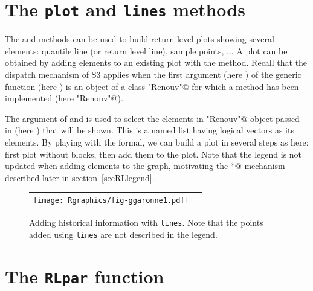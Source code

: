 \documentclass[a4paper]{report}
\begin{document}
\section{The \texttt{plot} and \texttt{lines} methods}
The \verb@plot@ and \verb@lines@ methods can be used to build return level plots
showing several elements: quantile line (or return level line), sample points,
$\dots$ A plot can be obtained by adding elements to an existing plot with the
\verb@lines@ method. Recall that the dispatch mechanism of S3 applies when the
first argument (here \verb@x@) of the generic function (here \verb@lines@)
is an object of a class \verb@"Renouv"@ for which a method has been implemented 
(here \verb@"Renouv"@).

\begin{Schunk}
\end{Schunk}
% 

\noindent
The \verb@show@ argument of \verb@plot@ and \verb@lines@ is used to
select the elements in \verb@"Renouv"@ object passed in \verb@x@ (here
\verb@Garonne@) that will be shown. This is a named list having
logical vectors as its elements. By playing with the \verb@show@
formal, we can build a plot in several steps as here: first plot
without \verb@MAX@ blocks, then add them to the plot.  Note that the
legend is not updated when adding elements to the graph, motivating
the \verb@RLlegend*@ mechanism described later in
section~\ref{secRLlegend}.
\begin{figure}
   \centering
   \begin{tabular}{c c} 
     \texttt{[image: Rgraphics/fig-ggaronne1.pdf]} &
   \end{tabular}
   \caption{\label{GGaronne1} Adding historical information with
     \texttt{lines}. Note that the points added using \texttt{lines}
     are not described in the legend.  }
\end{figure}

\section{The \texttt{RLpar} function} 
\end{document}
